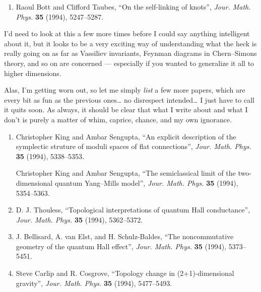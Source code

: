 \documentclass{article}
\def\tightlist{}
\begin{document}
\begin{enumerate}
\def\labelenumi{\arabic{enumi})}
\setcounter{enumi}{2}
\tightlist
\item
  Raoul Bott and Clifford Taubes, ``On the self-linking of knots'',
  \emph{Jour. Math. Phys.} \textbf{35} (1994), 5247--5287.
\end{enumerate}
\noindent
I'd need to look at this a few more times before I could say anything
intelligent about it, but it looks to be a very exciting way of
understanding what the heck is really going on as far as Vassiliev
invariants, Feynman diagrams in Chern--Simons theory, and so on are
concerned --- especially if you wanted to generalize it all to higher
dimensions.

Alas, I'm getting worn out, so let me simply \emph{list} a few more
papers, which are every bit as fun as the previous ones\ldots{} no
disrespect intended\ldots{} I just have to call it quits soon. As
always, it should be clear that what I write about and what I don't is
purely a matter of whim, caprice, chance, and my own ignorance.

\begin{enumerate}
\def\labelenumi{\arabic{enumi})}
\setcounter{enumi}{3}
\item
  Christopher King and Ambar Sengupta, ``An explicit description of the
  symplectic struture of moduli spaces of flat connections'',
  \emph{Jour. Math. Phys.} \textbf{35} (1994), 5338--5353.

  Christopher King and Ambar Sengupta, ``The semiclassical limit of the
  two-dimensional quantum Yang--Mills model'', \emph{Jour. Math. Phys.}
  \textbf{35} (1994), 5354--5363.
\item
  D. J. Thouless, ``Topological interpretations of quantum Hall
  conductance'', \emph{Jour. Math. Phys.} \textbf{35} (1994),
  5362--5372.
\item
  J. Bellisard, A. van Elst, and H. Schulz-Baldes, ``The noncommutative
  geometry of the quantum Hall effect'', \emph{Jour. Math. Phys.}
  \textbf{35} (1994), 5373--5451.
\item
  Steve Carlip and R. Cosgrove, ``Topology change in (2+1)-dimensional
  gravity'', \emph{Jour. Math. Phys.} \textbf{35} (1994), 5477--5493.
\end{enumerate}
\end{document}

